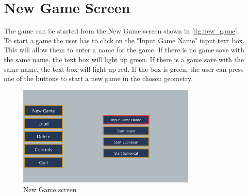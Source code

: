 \section{New Game Screen}
The game can be started from the New Game screen shown in \autoref{fig:new_game}.
To start a game the user has to click on the "Input Game Name" input text box.
This will allow them to enter a name for the game.
If there is no game save with the same name, the text box will light up green.
If there is a game save with the same name, the text box will light up red.
If the box is green, the user can press one of the buttons to start a new game in the chosen geometry.

\begin{figure}[H]
    \centering
    \includegraphics[width=0.8\textwidth]{chapters/user_manual/resources/new-game-no-input.png}
    \caption{New Game screen}
    \label{fig:new_game}
\end{figure}